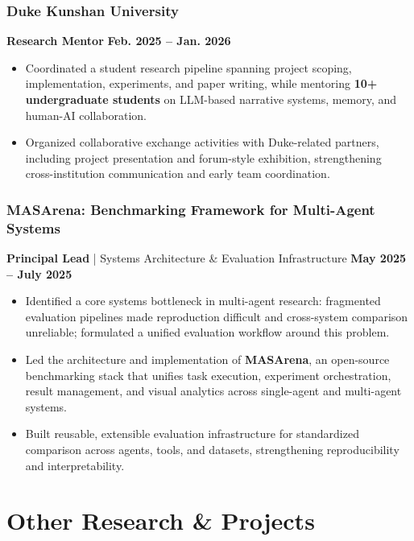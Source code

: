 \documentclass[10pt,a4paper]{article}
\begin{document}
\subsubsection*{\color{itemcolor}Duke Kunshan University}
\noindent\textbf{\color{sectioncolor}Research Mentor} \hfill \color{accentcolor}\textbf{Feb. 2025 -- Jan. 2026}
\begin{itemize}[leftmargin=*]
    \item Coordinated a student research pipeline spanning project scoping, implementation, experiments, and paper writing, while mentoring \textbf{10+ undergraduate students} on LLM-based narrative systems, memory, and human-AI collaboration.
    \item Organized collaborative exchange activities with Duke-related partners, including project presentation and forum-style exhibition, strengthening cross-institution communication and early team coordination.
\end{itemize}

\subsubsection*{\color{itemcolor}MASArena: Benchmarking Framework for Multi-Agent Systems}
\noindent\textbf{\color{sectioncolor}Principal Lead} | Systems Architecture \& Evaluation Infrastructure \hfill \color{accentcolor}\textbf{May 2025 -- July 2025}
\begin{itemize}[leftmargin=*]
    \item Identified a core systems bottleneck in multi-agent research: fragmented evaluation pipelines made reproduction difficult and cross-system comparison unreliable; formulated a unified evaluation workflow around this problem.
    \item Led the architecture and implementation of \textbf{MASArena}, an open-source benchmarking stack that unifies task execution, experiment orchestration, result management, and visual analytics across single-agent and multi-agent systems.
    \item Built reusable, extensible evaluation infrastructure for standardized comparison across agents, tools, and datasets, strengthening reproducibility and interpretability.
\end{itemize}

\section*{\color{sectioncolor}Other Research \& Projects}
\end{document}

